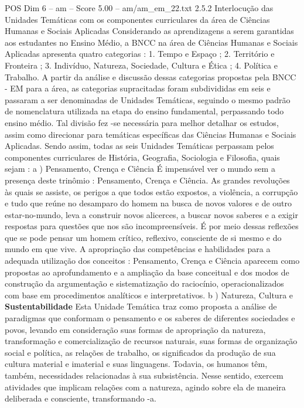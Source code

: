 \begin{textsample}{POS Dim 6 – am – Score 5.00 – am/am\_em\_22.txt}  \label{ex:f6_pos_268}
2.5.2 Interlocução das Unidades Temáticas com os componentes curriculares da área de Ciências Humanas e Sociais Aplicadas Considerando as aprendizagens a serem garantidas aos estudantes no Ensino Médio, a BNCC na área de Ciências Humanas e Sociais Aplicadas apresenta quatro categorias : 1.
Tempo e Espaço ; 2.
Território e Fronteira ; 3.
Indivíduo, Natureza, Sociedade, Cultura e Ética ; 4.
Política e Trabalho.
A partir da análise e discussão dessas categorias propostas pela BNCC - EM para a área, as categorias supracitadas foram subdivididas em seis e passaram a ser denominadas de Unidades Temáticas, seguindo o mesmo padrão de nomenclatura utilizada na etapa do ensino fundamental, perpassando todo ensino médio.
Tal divisão fez -se necessária para melhor detalhar os estudos, assim como direcionar para temáticas específicas das Ciências Humanas e Sociais Aplicadas.
Sendo assim, todas as seis Unidades Temáticas perpassam pelos componentes curriculares de História, Geografia, Sociologia e Filosofia, quais sejam : a ) Pensamento, Crença e Ciência É impensável ver o mundo sem a presença deste trinômio : Pensamento, Crença e Ciência.
As grandes revoluções às quais se assiste, os perigos a que todos estão expostos, a violência, a corrupção e tudo que reúne no desamparo do homem na busca de novos valores e de outro estar-no-mundo, leva a construir novos alicerces, a buscar novos saberes e a exigir respostas para questões que nos são incompreensíveis.
É por meio dessas reflexões que se pode pensar um homem crítico, reflexivo, consciente de si mesmo e do mundo em que vive.
A apropriação das competências e habilidades para a adequada utilização dos conceitos : Pensamento, Crença e Ciência aparecem como propostas ao aprofundamento e a ampliação da base conceitual e dos modos de construção da argumentação e sistematização do raciocínio, operacionalizados com base em procedimentos analíticos e interpretativos. b ) Natureza, Cultura e \textbf{Sustentabilidade} Esta Unidade Temática traz como proposta a análise de paradigmas que conformam o pensamento e os saberes de diferentes sociedades e povos, levando em consideração suas formas de apropriação da natureza, transformação e comercialização de recursos naturais, suas formas de organização social e política, as relações de trabalho, os significados da produção de sua cultura material e imaterial e suas linguagens.
Todavia, os humanos têm, também, necessidades relacionadas à sua subsistência.
Nesse sentido, exercem atividades que implicam relações com a natureza, agindo sobre ela de maneira deliberada e consciente, transformando -a.

\end{textsample}
